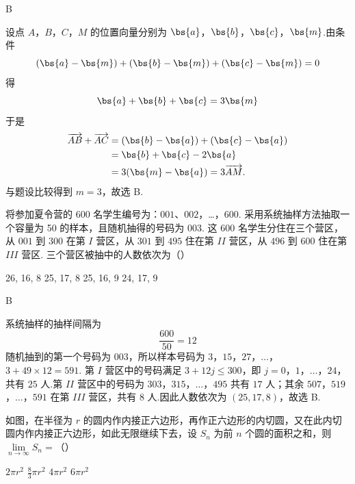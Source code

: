 \begin{answer}
B
\end{answer}

\begin{solution}
设点 \(A\)，\(B\)，\(C\)，\(M\) 的位置向量分别为
\(\bs{a}\)，\(\bs{b}\)，\(\bs{c}\)，\(\bs{m}\).由条件
\[
(\bs{a}-\bs{m})+(\bs{b}-\bs{m})
+(\bs{c}-\bs{m})=0
\]
得
\[
\bs{a}+\bs{b}+\bs{c}=3\bs{m}
\]
于是
\[
\begin{aligned}
\overrightarrow{AB}+\overrightarrow{AC}
&=(\bs{b}-\bs{a})+(\bs{c}-\bs{a})\\
&=\bs{b}+\bs{c}-2\bs{a}\\
&=3(\bs{m}-\bs{a})
=3\overrightarrow{AM}.
\end{aligned}
\]
与题设比较得到 \(m=3\)，故选 B.
\end{solution}

\begin{problem}
将参加夏令营的 600 名学生编号为：\(001\)、\(002\)，…，\(600\). 采用系统抽样方法抽取一个容量为 50 的样本，且随机抽得的号码为 \(003\). 这 600 名学生分住在三个营区，从 \(001\) 到 \(300\) 在第 \(I\) 营区，从 \(301\) 到 \(495\) 住在第 \(II\) 营区，从 \(496\) 到 \(600\) 住在第 \(III\) 营区. 三个营区被抽中的人数依次为（\quad）

\choices
    {26, 16, 8}
    {25, 17, 8}
    {25, 16, 9}
    {24, 17, 9}
\end{problem}

\begin{answer}
B
\end{answer}

\begin{solution}
系统抽样的抽样间隔为
\[
\frac{600}{50}=12
\]
随机抽到的第一个号码为 \(003\)，所以样本号码为
\(3\)，\(15\)，\(27\)，\(\ldots\)，\(3+49\times12=591\).
第 \(I\) 营区中的号码满足 \(3+12j\leqslant300\)，即
\(j=0\)，\(1\)，\(\ldots\)，\(24\)，共有 \(25\) 人.第 \(II\) 营区中的号码为
\(303\)，\(315\)，\(\ldots\)，\(495\)
共有 \(17\) 人；其余
\(507\)，\(519\)，\(\ldots\)，\(591\)
在第 \(III\) 营区，共有 \(8\) 人.因此人数依次为
\((25,17,8)\)，故选 B.
\end{solution}

\begin{problem}
如图，在半径为 \(r\) 的圆内作内接正六边形，再作正六边形的内切圆，又在此内切圆内作内接正六边形，如此无限继续下去，设 \( S_{n} \) 为前 \(n\) 个圆的面积之和，则 \( \lim\limits_{n\to\infty}S_{n}= \)（\quad）


\choices
    {\(2\pi r^{2}\)}
    {\(\frac{8}{3}\pi r^2\)}
    {\(4\pi r^{2}\)}
    {\(6\pi r^{2}\)}
\end{problem}

